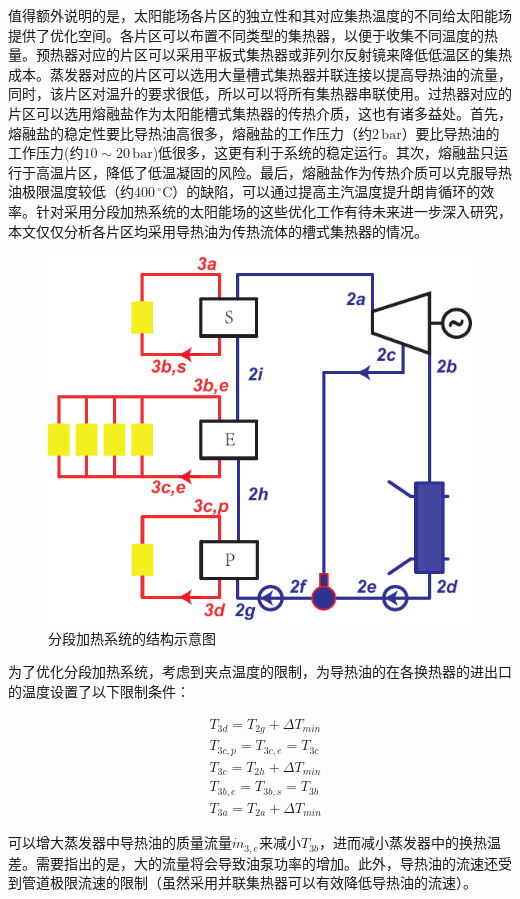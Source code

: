 值得额外说明的是，太阳能场各片区的独立性和其对应集热温度的不同给太阳能场提供了优化空间。各片区可以布置不同类型的集热器，以便于收集不同温度的热量。预热器对应的片区可以采用平板式集热器或菲列尔反射镜来降低低温区的集热成本。蒸发器对应的片区可以选用大量槽式集热器并联连接以提高导热油的流量，同时，该片区对温升的要求很低，所以可以将所有集热器串联使用。过热器对应的片区可以选用熔融盐作为太阳能槽式集热器的传热介质，这也有诸多益处。首先，熔融盐的稳定性要比导热油高很多，熔融盐的工作压力（约$2\,\mathrm{bar}$）要比导热油的工作压力(约$10\sim20\,\mathrm{bar}$)低很多，这更有利于系统的稳定运行。其次，熔融盐只运行于高温片区，降低了低温凝固的风险。最后，熔融盐作为传热介质可以克服导热油极限温度较低（约400$\,^\circ\mathrm{C}$）的缺陷，可以通过提高主汽温度提升朗肯循环的效率。针对采用分段加热系统的太阳能场的这些优化工作有待未来进一步深入研究，本文仅仅分析各片区均采用导热油为传热流体的槽式集热器的情况。

\noindent \begin{figure}[htbp]
\begin{center}
	\includegraphics[width = 0.5\columnwidth]{fig/SEP}
	\caption{分段加热系统的结构示意图}
	\label{fig:SEP}
\end{center}
\end{figure}

为了优化分段加热系统，考虑到夹点温度的限制，为导热油的在各换热器的进出口的温度设置了以下限制条件：

\begin{eqnarray*}
	&T_{3d} = T_{2g} + \Delta T_{min}\\
   &T_{3c,p} = T_{3c,e} = T_{3c}\\
   &T_{3c} = T_{2h} + \Delta T_{min}\\
	&T_{3b,e} = T_{3b,s} = T_{3b}\\
	&T_{3a} = T_{2a} + \Delta T_{min}
\end{eqnarray*}

可以增大蒸发器中导热油的质量流量$\dot{m}_{3,e}$来减小$T_{3b}$，进而减小蒸发器中的换热温差。需要指出的是，大的流量将会导致油泵功率的增加。此外，导热油的流速还受到管道极限流速的限制（虽然采用并联集热器可以有效降低导热油的流速）。

